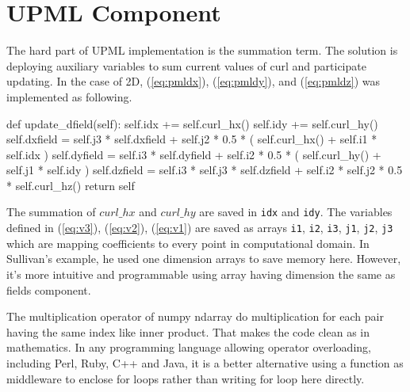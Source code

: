 \section{UPML Component}
The hard part of UPML implementation is the summation term. The solution is deploying auxiliary variables to sum current
values of curl and participate updating. In the case of 2D, (\ref{eq:pmldx}), (\ref{eq:pmldy}), and (\ref{eq:pmldz})
was implemented as following.
\begin{code}
    def update_dfield(self):
        self.idx += self.curl_hx()
        self.idy += self.curl_hy()
        self.dxfield = self.j3 * self.dxfield 
                     + self.j2 * 0.5 * ( self.curl_hx() + self.i1 * self.idx )
        self.dyfield = self.i3 * self.dyfield 
                     + self.i2 * 0.5 * ( self.curl_hy() + self.j1 * self.idy )
        self.dzfield = self.i3 * self.j3 * self.dzfield 
                     + self.i2 * self.j2 * 0.5 * self.curl_hz()
        return self
\end{code}
The summation of $curl\_hx$ and $curl\_hy$ are saved in \texttt{idx} and \texttt{idy}. The variables defined in
(\ref{eq:v3}), (\ref{eq:v2}), (\ref{eq:v1}) are saved as arrays \texttt{i1}, \texttt{i2}, \texttt{i3}, \texttt{j1},
\texttt{j2}, \texttt{j3} which are mapping coefficients to every point in computational domain. In Sullivan's example,
he used one dimension arrays to save memory here. However, it's more intuitive and programmable using array having
dimension the same as fields component.

The multiplication operator of numpy ndarray do multiplication for each pair having the same index like inner
product. That makes the code clean as in mathematics. In any programming language allowing operator overloading,
including Perl, Ruby, C++ and Java, it is a better alternative using a function as middleware to enclose for loops
rather than writing for loop here directly.

